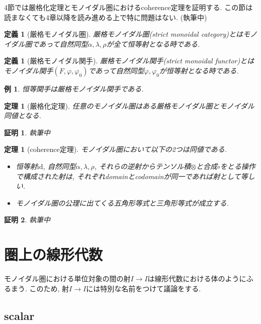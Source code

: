 \documentclass[a4paper,12pt]{ltjsarticle}
\theoremstyle{break}
\newtheorem{defn}[thm]{定義}
\newtheorem{thrm}[thm]{定理}
\newtheorem{eg}[thm]{例}
\newtheorem*{prf}{証明}
\newcommand{\id}{\mathrm{id}}
\newcommand{\al}{\alpha}
\newcommand{\la}{\lambda}
\newcommand{\vp}{\varphi}
\newcommand{\ot}{\otimes}
\numberwithin{equation}{section}
\begin{document}
4節では厳格化定理とモノイダル圏におけるcoherence定理を証明する. 
この節は読まなくても4章以降を読み進める上で特に問題はない. 
(執筆中)

\begin{defn}[厳格モノイダル圏]
  厳格モノイダル圏(strict monoidal category)とはモノイダル圏であって自然同型$\al,\la,\rho$が全て恒等射となる時である. 
\end{defn}

\begin{defn}[厳格モノイダル関手]
  厳格モノイダル関手(strict monoidal functor)とはモノイダル関手$(F,\vp,\vp_0)$であって自然同型$\vp,\vp_0$が恒等射となる時である. 
\end{defn}

\begin{eg}
  恒等関手は厳格モノイダル関手である. 
\end{eg}

\begin{thrm}[厳格化定理]
  任意のモノイダル圏はある厳格モノイダル圏とモノイダル同値となる.  
\end{thrm} 

\begin{prf}
  執筆中
\end{prf}

\begin{thrm}[coherence定理]
  モノイダル圏において以下の2つは同値である. 
  \begin{itemize}
    \item 恒等射$\id$, 自然同型$\al,\la,\rho$, それらの逆射からテンソル積$\ot$と合成$\circ$をとる操作で構成された射は, それぞれdomainとcodomainが同一であれば射として等しい. 
    \item モノイダル圏の公理に出てくる五角形等式と三角形等式が成立する. 
  \end{itemize}
\end{thrm}

\begin{prf}
  執筆中
\end{prf}

\newpage

\section{圏上の線形代数}

モノイダル圏における単位対象の間の射$I \to I$は線形代数における体のようにふるまう. 
このため, 射$I \to I$には特別な名前をつけて議論をする. 

\subsection{scalar}
\end{document}

